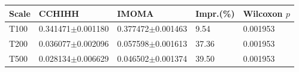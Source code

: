 \begin{tabular}{lllll}
\hline
Scale & CCHIHH & IMOMA & Impr.(\%) & Wilcoxon $p$ \\
\hline
T100 & 0.341471$\pm$0.001180 & 0.377472$\pm$0.001463 & 9.54 & 0.001953 \\
T200 & 0.036077$\pm$0.002096 & 0.057598$\pm$0.001613 & 37.36 & 0.001953 \\
T500 & 0.028134$\pm$0.006629 & 0.046502$\pm$0.001374 & 39.50 & 0.001953 \\
\hline
\end{tabular}